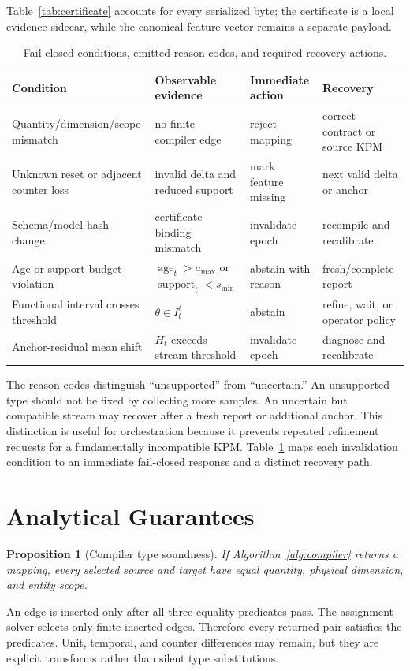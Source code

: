 \documentclass[10pt,journal,twoside]{IEEEtran}
\newtheorem{proposition}{Proposition}
\begin{document}
Table~\ref{tab:certificate} accounts for every serialized byte; the certificate is a local evidence sidecar, while the canonical feature vector remains a separate payload.

\begin{table}[t]
\caption{Fail-closed conditions, emitted reason codes, and required recovery actions.}
\label{tab:failures}
\centering
\scriptsize
\setlength{\tabcolsep}{5pt}
\begin{tabular}{llll}
\toprule
Condition & Observable evidence & Immediate action & Recovery \\
\midrule
Quantity/dimension/scope mismatch & no finite compiler edge & reject mapping & correct contract or source KPM \\
Unknown reset or adjacent counter loss & invalid delta and reduced support & mark feature missing & next valid delta or anchor \\
Schema/model hash change & certificate binding mismatch & invalidate epoch & recompile and recalibrate \\
Age or support budget violation & $\operatorname{age}_t>a_{\max}$ or $\operatorname{support}_t<s_{\min}$ & abstain with reason & fresh/complete report \\
Functional interval crosses threshold & $\theta\in I_t^\ell$ & abstain & refine, wait, or operator policy \\
Anchor-residual mean shift & $H_t$ exceeds stream threshold & invalidate epoch & diagnose and recalibrate \\
\bottomrule
\end{tabular}
\end{table}

The reason codes distinguish ``unsupported'' from ``uncertain.'' An unsupported type should not be fixed by collecting more samples. An uncertain but compatible stream may recover after a fresh report or additional anchor. This distinction is useful for orchestration because it prevents repeated refinement requests for a fundamentally incompatible KPM.
Table~\ref{tab:failures} maps each invalidation condition to an immediate fail-closed response and a distinct recovery path.

\section{Analytical Guarantees}
\begin{proposition}[Compiler type soundness]
If Algorithm~\ref{alg:compiler} returns a mapping, every selected source and target have equal quantity, physical dimension, and entity scope.
\end{proposition}
\begin{IEEEproof}
An edge is inserted only after all three equality predicates pass. The assignment solver selects only finite inserted edges. Therefore every returned pair satisfies the predicates. Unit, temporal, and counter differences may remain, but they are explicit transforms rather than silent type substitutions.
\end{IEEEproof}
\end{document}
